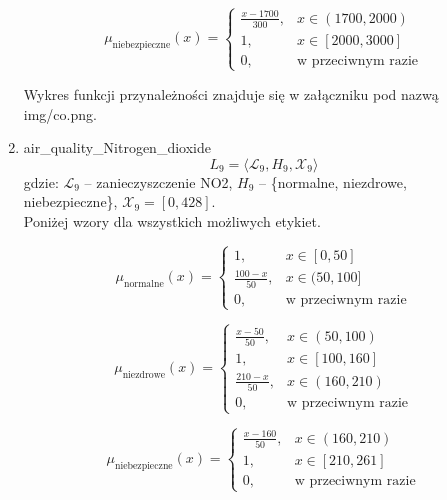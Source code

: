 \documentclass{article}
\begin{document}
\begin{enumerate}
    \begin{equation}
    \mu_{\text{niebezpieczne}}(x) =
    \begin{cases}
    \frac{x - 1700}{300}, & x \in (1700, 2000) \\
    1, & x \in [2000, 3000] \\
    0, & \text{w przeciwnym razie}
    \end{cases}
    \end{equation}

Wykres funkcji przynależności znajduje się w załączniku pod nazwą img/co.png.
    
    \item air\_quality\_Nitrogen\_dioxide
                \begin{equation}
            L_9 = \langle \mathcal{L}_9, H_9, \mathcal{X}_9 \rangle
        \end{equation}
        gdzie: $\mathcal{L}_9$ – zanieczyszczenie NO2, $H_9$ – \{normalne, niezdrowe, niebezpieczne\}, $\mathcal{X}_9 = [0, 428]$. \\
        Poniżej wzory dla wszystkich możliwych etykiet.

    \begin{equation}
    \mu_{\text{normalne}}(x) =
    \begin{cases}
    1, & x \in [0, 50] \\
    \frac{100 - x}{50}, & x \in (50, 100] \\
    0, & \text{w przeciwnym razie}
    \end{cases}
    \end{equation}
    
    \begin{equation}
    \mu_{\text{niezdrowe}}(x) =
    \begin{cases}
    \frac{x - 50}{50}, & x \in (50, 100) \\
    1, & x \in [100, 160] \\
    \frac{210 - x}{50}, & x \in (160, 210) \\
    0, & \text{w przeciwnym razie}
    \end{cases}
    \end{equation}
    
    \begin{equation}
    \mu_{\text{niebezpieczne}}(x) =
    \begin{cases}
    \frac{x - 160}{50}, & x \in (160, 210) \\
    1, & x \in [210, 261] \\
    0, & \text{w przeciwnym razie}
    \end{cases}
    \end{equation}


\end{enumerate}
\end{document}
